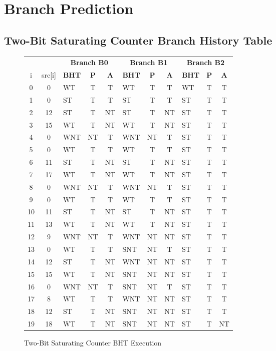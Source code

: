 \documentclass[10pt]{article}
\begin{document}
\cleardoublepage
\section{Branch Prediction}

\subsection{Two-Bit Saturating Counter Branch History Table}

\begin{figure}[H]
\centering
{
\begin{tabular}{@{\extracolsep{3pt}}cclcclcclcc@{}}
\hline
& & \multicolumn{3}{c}{\textbf{Branch B0}} & \multicolumn{3}{c}{\textbf{Branch B1}} & \multicolumn{3}{c}{\textbf{Branch B2}}\\
\cline{3-5}
\cline{6-8}
\cline{9-11}
i & src[i] & \textbf{BHT} & \textbf{P} & \textbf{A} & \textbf{BHT} & \textbf{P} & \textbf{A} & \textbf{BHT} & \textbf{P} & \textbf{A} \\ \hline
0 & 0 & WT& T & T & WT& T & T & WT& T & T \\ \hline
1 & 0 & ST& T & T & ST& T & T & ST& T & T \\ \hline
2 & 12& ST& T & NT& ST& T & NT& ST& T & T \\ \hline
3 & 15& WT& T & NT& WT& T & NT& ST& T & T \\ \hline
4 & 0 &WNT& NT& T &WNT& NT& T & ST& T & T \\ \hline
5 & 0 & WT& T & T & WT& T & T & ST& T & T \\ \hline
6 & 11& ST& T & NT& ST& T & NT& ST& T & T \\ \hline
7 & 17& WT& T & NT& WT& T & NT& ST& T & T \\ \hline
8 & 0 &WNT& NT& T &WNT& NT& T & ST& T & T \\ \hline
9 & 0 & WT& T & T & WT& T & T & ST& T & T \\ \hline
10& 11& ST& T & NT& ST& T & NT& ST& T & T \\ \hline
11& 13& WT& T & NT& WT& T & NT& ST& T & T \\ \hline
12& 9 &WNT& NT& T &WNT& NT& NT& ST& T & T \\ \hline
13& 0 & WT& T & T &SNT& NT& T & ST& T & T \\ \hline
14& 12& ST& T & NT&WNT& NT& NT& ST& T & T \\ \hline
15& 15& WT& T & NT&SNT& NT& NT& ST& T & T \\ \hline
16& 0 &WNT& NT& T &SNT& NT& T & ST& T & T \\ \hline
17& 8 & WT& T & T &WNT& NT& NT& ST& T & T \\ \hline
18& 12& ST& T & NT&SNT& NT& NT& ST& T & T \\ \hline
19& 18& WT& T & NT&SNT& NT& NT& ST& T & NT\\ \hline
\end{tabular}
}
\caption{Two-Bit Saturating Counter BHT Execution}
\end{figure}
\end{document}
